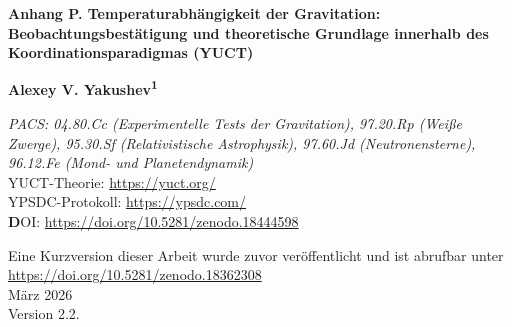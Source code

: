 \documentclass[12pt]{article}
\theoremstyle{remark}
\begin{document}
	
	\begin{titlepage}
		\centering
		\vspace*{0cm}
		
		\Huge\textbf{Anhang P. Temperaturabhängigkeit der Gravitation: Beobachtungsbestätigung und theoretische Grundlage innerhalb des Koordinationsparadigmas (YUCT)}
		
		\vspace{2.3cm}
		
		\Large\textbf{Alexey V. Yakushev\textsuperscript{1}}
		
		\vspace{0.2cm}
		
		\vspace{1.3cm}
		\large\textit{PACS: 04.80.Cc (Experimentelle Tests der Gravitation), 97.20.Rp (Weiße Zwerge), 95.30.Sf (Relativistische Astrophysik), 97.60.Jd (Neutronensterne), 96.12.Fe (Mond- und Planetendynamik)} \\
		
		YUCT-Theorie: \url{https://yuct.org/}\\
		YPSDC-Protokoll: \url{https://ypsdc.com/}\\
		
		\vspace{2cm}
		\textbf DOI: \url{https://doi.org/10.5281/zenodo.18444598}\\
		
		\vspace{1cm}
		
		\large 
		Eine Kurzversion dieser Arbeit wurde zuvor veröffentlicht und ist abrufbar unter\\ \url{https://doi.org/10.5281/zenodo.18362308}\\
		\vspace{1cm}
		März 2026 \\ \large Version 2.2.
		

\end{titlepage}
\end{document}
